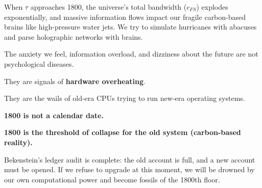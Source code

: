 When $\tau$ approaches 1800, the universe's total bandwidth ($c_{FS}$) explodes exponentially, and massive information flows impact our fragile carbon-based brains like high-pressure water jets. We try to simulate hurricanes with abacuses and parse holographic networks with brains.

The anxiety we feel, information overload, and dizziness about the future are not psychological diseases.

They are signals of \textbf{hardware overheating}.

They are the wails of old-era CPUs trying to run new-era operating systems.

\textbf{1800 is not a calendar date.}

\textbf{1800 is the threshold of collapse for the old system (carbon-based reality).}

Bekenstein's ledger audit is complete: the old account is full, and a new account must be opened. If we refuse to upgrade at this moment, we will be drowned by our own computational power and become fossils of the 1800th floor.


